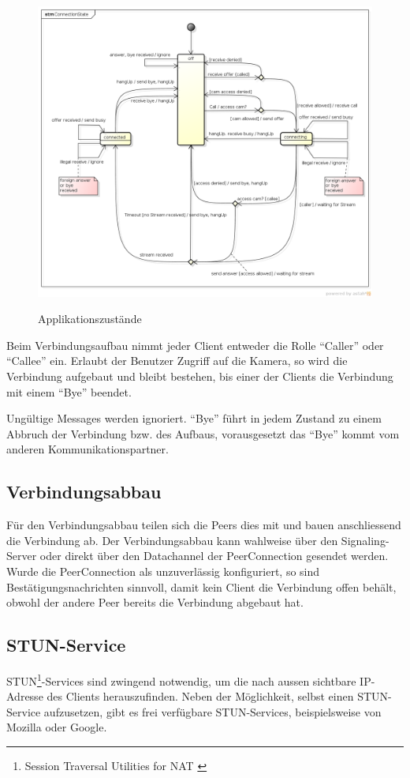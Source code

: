 		\begin{figure}[H]
			\centering
			\includegraphics[width=\linewidth]{../architekturanalayse/img/connectionState.png}
			\label{img:deployment}
			\caption{Applikationszustände}
		\end{figure}
		Beim Verbindungsaufbau nimmt jeder Client entweder die Rolle "`Caller"' oder
		"`Callee"' ein. Erlaubt der Benutzer Zugriff auf die Kamera, so wird die
		Verbindung aufgebaut und bleibt bestehen, bis einer der Clients die Verbindung
		mit einem "`Bye"' beendet.
		
		Ungültige Messages werden ignoriert. "`Bye"' führt in jedem Zustand zu einem
		Abbruch der Verbindung bzw. des Aufbaus, vorausgesetzt das "`Bye"'
		kommt vom anderen Kommunikationspartner.
	
	\subsection{Verbindungsabbau}
		Für den Verbindungsabbau teilen sich die Peers dies mit und bauen anschliessend die Verbindung ab. Der Verbindungsabbau kann wahlweise über den Signaling-Server oder direkt über den Datachannel der PeerConnection gesendet werden. Wurde die PeerConnection als unzuverlässig konfiguriert, so sind Bestätigungsnachrichten sinnvoll, damit kein Client die Verbindung offen behält, obwohl der andere Peer bereits die Verbindung abgebaut hat.
	
	\subsection{STUN-Service}
		STUN\footnote{Session Traversal Utilities for NAT \cite{IETF-STUN-RFC}}-Services sind zwingend
		notwendig, um die nach aussen sichtbare IP-Adresse des Clients herauszufinden.
		Neben der Möglichkeit, selbst einen STUN-Service aufzusetzen, gibt es frei
		verfügbare STUN-Services, beispielsweise von Mozilla oder Google.

